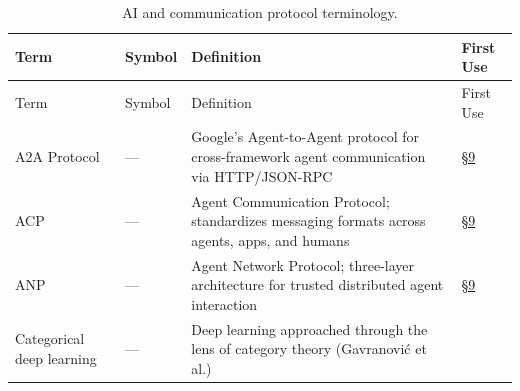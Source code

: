 \documentclass[
]{article}
\begin{document}
\begin{longtable}[]{@{}
  >{\raggedright\arraybackslash}p{}
  >{\centering\arraybackslash}p{}
  >{\raggedright\arraybackslash}p{}
  >{\centering\arraybackslash}p{}@{}}
\caption{AI and communication protocol
terminology.}\label{tbl:not-ai-protocols}\tabularnewline
\toprule\noalign{}
\begin{minipage}[b]{\linewidth}\raggedright
Term
\end{minipage} & \begin{minipage}[b]{\linewidth}\centering
Symbol
\end{minipage} & \begin{minipage}[b]{\linewidth}\raggedright
Definition
\end{minipage} & \begin{minipage}[b]{\linewidth}\centering
First Use
\end{minipage} \\
\midrule\noalign{}
\endfirsthead
\toprule\noalign{}
\begin{minipage}[b]{\linewidth}\raggedright
Term
\end{minipage} & \begin{minipage}[b]{\linewidth}\centering
Symbol
\end{minipage} & \begin{minipage}[b]{\linewidth}\raggedright
Definition
\end{minipage} & \begin{minipage}[b]{\linewidth}\centering
First Use
\end{minipage} \\
\midrule\noalign{}
\endhead
\bottomrule\noalign{}
\endlastfoot
A2A Protocol & --- & Google's Agent-to-Agent protocol for
cross-framework agent communication via HTTP/JSON-RPC &
\href{09_ai_implications.md\#sec:ai-implications}{§9} \\
ACP & --- & Agent Communication Protocol; standardizes messaging formats
across agents, apps, and humans &
\href{09_ai_implications.md\#sec:ai-implications}{§9} \\
ANP & --- & Agent Network Protocol; three-layer architecture for trusted
distributed agent interaction &
\href{09_ai_implications.md\#sec:ai-implications}{§9} \\
Categorical deep learning & --- & Deep learning approached through the
lens of category theory (Gavranović et al.) &

\end{longtable}
\end{document}
